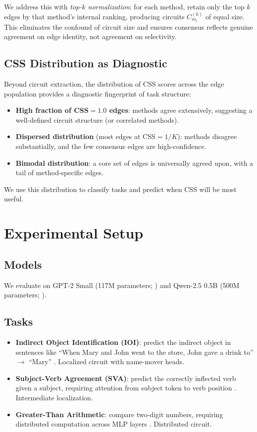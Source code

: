 \documentclass[11pt,a4paper]{article}
\newcommand{\css}{\textsc{CSS}}
\begin{document}
We address this with \emph{top-$k$ normalization}: for each method, retain only the top $k$ edges by that method's internal ranking, producing circuits $C_{m_i}^{(k)}$ of equal size.
This eliminates the confound of circuit size and ensures consensus reflects genuine agreement on edge identity, not agreement on selectivity.

\subsection{CSS Distribution as Diagnostic}

Beyond circuit extraction, the distribution of \css{} scores across the edge population provides a diagnostic fingerprint of task structure:
\begin{itemize}[nosep]
    \item \textbf{High fraction of \css{}$=1.0$ edges}: methods agree extensively, suggesting a well-defined circuit structure (or correlated methods).
    \item \textbf{Dispersed distribution} (most edges at \css{}$=1/K$): methods disagree substantially, and the few consensus edges are high-confidence.
    \item \textbf{Bimodal distribution}: a core set of edges is universally agreed upon, with a tail of method-specific edges.
\end{itemize}
We use this distribution to classify tasks and predict when \css{} will be most useful.

\section{Experimental Setup}
\label{sec:setup}

\subsection{Models}
We evaluate on GPT-2 Small (117M parameters; \cite{radford2019language}) and Qwen-2.5 0.5B (500M parameters; \cite{qwen2025qwen25}).

\subsection{Tasks}
\begin{itemize}[nosep]
    \item \textbf{Indirect Object Identification (IOI)}: predict the indirect object in sentences like ``When Mary and John went to the store, John gave a drink to'' $\rightarrow$ ``Mary'' \cite{wang2023interpretability}. Localized circuit with name-mover heads.
    \item \textbf{Subject-Verb Agreement (SVA)}: predict the correctly inflected verb given a subject, requiring attention from subject token to verb position \cite{finlayson2021causal}. Intermediate localization.
    \item \textbf{Greater-Than Arithmetic}: compare two-digit numbers, requiring distributed computation across MLP layers \cite{hanna2023how}. Distributed circuit.
\end{itemize}
\end{document}
